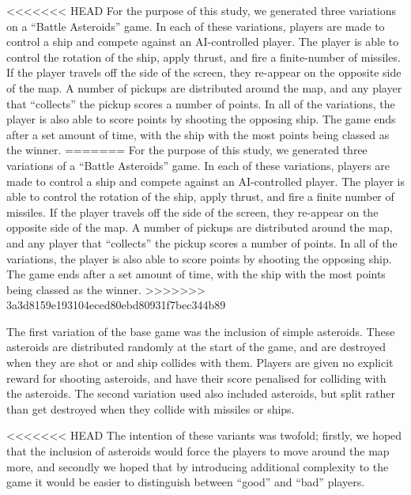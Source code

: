 <<<<<<< HEAD
For the purpose of this study, we generated three variations on a “Battle Asteroids” game. In each of these variations, players are made to control a ship and compete against an AI-controlled player. The player is able to control the rotation of the ship, apply thrust, and fire a finite-number of missiles. If the player travels off the side of the screen, they re-appear on the opposite side of the map. A number of pickups are distributed around the map, and any player that “collects” the pickup scores a number of points. In all of the variations, the player is also able to score points by shooting the opposing ship. The game ends after a set amount of time, with the ship with the most points being classed as the winner.
=======
For the purpose of this study, we generated three variations of a “Battle Asteroids” game. In each of these variations, players are made to control a ship and compete against an AI-controlled player. The player is able to control the rotation of the ship, apply thrust, and fire a finite number of missiles. If the player travels off the side of the screen, they re-appear on the opposite side of the map. A number of pickups are distributed around the map, and any player that “collects” the pickup scores a number of points. In all of the variations, the player is also able to score points by shooting the opposing ship. The game ends after a set amount of time, with the ship with the most points being classed as the winner.
>>>>>>> 3a3d8159e193104eced80ebd80931f7bec344b89

The first variation of the base game was the inclusion of simple asteroids. These asteroids are distributed randomly at the start of the game, and are destroyed when they are shot or and ship collides with them. Players are given no explicit reward for shooting asteroids, and have their score penalised for colliding with the asteroids. The second variation used also included asteroids, but split rather than get destroyed when they collide with missiles or ships.

<<<<<<< HEAD
The intention of these variants was twofold; firstly, we hoped that the inclusion of asteroids would force the players to move around the map more, and secondly we hoped that by introducing additional complexity to the game it would be easier to distinguish between “good” and “bad” players.

